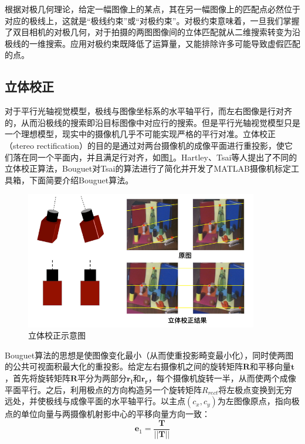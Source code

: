 根据对极几何理论，给定一幅图像上的某点，其在另一幅图像上的匹配点必然位于对应的极线上，这就是“极线约束”或“对极约束”。对极约束意味着，一旦我们掌握了双目相机的对极几何，对于拍摄的两图图像间的立体匹配就从二维搜索转变为沿极线的一维搜索。应用对极约束既降低了运算量，又能排除许多可能导致虚假匹配的点。


\subsection{立体校正}
对于平行光轴视觉模型，极线与图像坐标系的水平轴平行，而左右图像是行对齐的，从而沿极线的搜索即沿目标图像中对应行的搜索。但是平行光轴视觉模型只是一个理想模型，现实中的摄像机几乎不可能实现严格的平行对准。立体校正（stereo rectification）的目的是通过对两台摄像机的成像平面进行重投影，使它们落在同一个平面内，并且满足行对齐，如图\ref{fig:2_3_stereo_rectification}。Hartley\cite{hartley1999theory}、Tsai\cite{tsai1987versatile}等人提出了不同的立体校正算法，Bouguet对Tsai的算法进行了简化并开发了MATLAB摄像机标定工具箱，下面简要介绍Bouguet算法。

\begin{figure}[!htb] %
	\centering
	\includegraphics[width=4in]{figures/2_3_stereo_rectification}
	\caption{立体校正示意图}\label{fig:2_3_stereo_rectification}
\end{figure}

Bouguet算法的思想是使图像变化最小（从而使重投影畸变最小化），同时使两图的公共可视面积最大化的重投影\cite{bradski2008learning}。给定左右摄像机之间的旋转矩阵$\mathbf{R}$和平移向量$\mathbf{t}$，首先将旋转矩阵$\mathbf{R}$平分为两部分$\mathbf{r_l}$和$\mathbf{r_r}$，每个摄像机旋转一半，从而使两个成像平面平行。之后，利用极点的方向构造另一个旋转矩阵$R_{rect}$将左极点变换到无穷远处，并使极线与成像平面的水平轴平行。以主点$(c_x, c_y)$为左图像原点，指向极点的单位向量与两摄像机射影中心的平移向量方向一致：
%
\begin{equation}\label{eq:2_3_7}
\mathbf{e}_1 = \frac{\mathbf{T}}{||\mathbf{T}||}
\end{equation}

